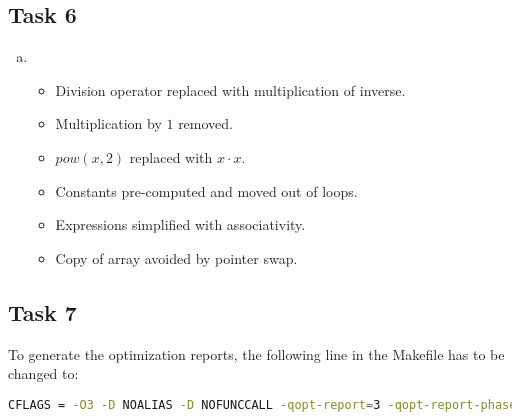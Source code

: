\documentclass[11pt]{article}
\begin{document}
    \subsection*{Task 6}
    \label{subsec:Task6}
    \begin{enumerate}[a)]
        \item \begin{itemize}
                  \item Division operator replaced with multiplication of
                  inverse.
                  \item Multiplication by $1$ removed.
                  \item $pow\left(x, 2\right)$ replaced with $x \cdot x$.
                  \item Constants pre-computed and moved out of loops.
                  \item Expressions simplified with associativity.
                  \item Copy of array avoided by pointer swap.
        \end{itemize}
    \end{enumerate}

    \subsection*{Task 7}
    \label{subsec:Task7}
    To generate the optimization reports, the following line in the Makefile
    has to be changed to:
    \begin{lstlisting}[language=bash, basicstyle=\tiny]
CFLAGS = -O3 -D NOALIAS -D NOFUNCCALL -qopt-report=3 -qopt-report-phase=vec
    \end{lstlisting}
\end{document}
